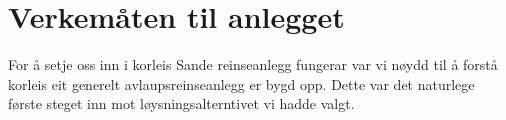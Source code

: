 \chapter{Verkemåten til anlegget}\label{sec:6}
\thispagestyle{fancy}

For å setje oss inn i korleis Sande reinseanlegg fungerar var vi nøydd til å forstå
korleis eit generelt avlaupsreinseanlegg er bygd opp. Dette var det naturlege første
steget inn mot løysningsalterntivet vi hadde valgt. 


